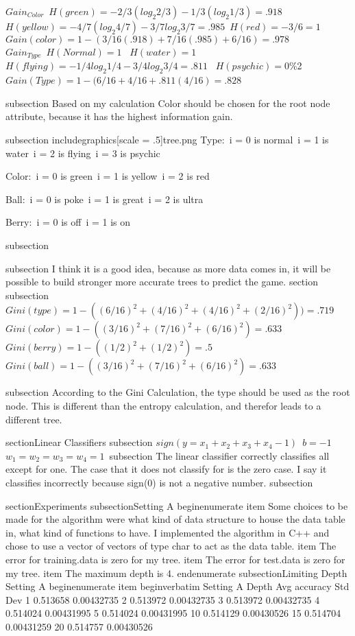 $Gain_{Color}$\
$H(green) = -2/3(log_2{2/3}) - 1/3(log_2{1/3}) = .918$\
$H(yellow) =  -4/7(log_2{4/7}) - 3/7log_2{3/7} = .985$\
$H(red) = -3/6 = 1$\
$Gain(color) = 1 - (3/16(.918) + 7/16(.985) + 6/16) = .978$\\

$Gain_{Type}$\
$H(Normal)= 1$\ %
$H(water) = 1$\ %
$H(flying) = -1/4log_2{1/4} -3/4log_2{3/4} = .811$\ %
$H(psychic) = 0$\%2
$Gain(Type) = 1 - (6/16 + 4/16 + .811(4/16) = .828$\

subsection{}
Based on my calculation Color should be chosen for the root node attribute, because it has the highest information gain.\

subsection{}%
includegraphics[scale = .5]{tree.png}
Type:\
i = 0 is normal\
i = 1 is water\
i = 2 is flying\
i = 3 is psychic\

Color:\
i = 0 is green\
i = 1 is yellow\
i = 2 is red\

Ball:\
i = 0 is poke\
i = 1 is great\
i = 2 is ultra\


Berry:\
i = 0 is off\
i = 1 is on\

subsection{}

subsection{}
I think it is a good idea, because as more data comes in, it will be possible to build stronger more accurate trees to predict the game.
section{}
subsection{}
$Gini(type) = 1 - ((6/16)^2 + (4/16)^2 + (4/16)^2 + (2/16)^2)) = .719$\
$Gini(color) = 1 - ((3/16)^2 + (7/16)^2 + (6/16)^2) = .633$\
$Gini(berry) = 1 - ((1/2)^2 + (1/2)^2) = .5$\
$Gini(ball) = 1 - ((3/16)^2 + (7/16)^2 + (6/16)^2) = .633$\


subsection{}
According to the Gini Calculation, the type should be used as the root node. This is different than the entropy calculation, and therefor leads to a different tree.

section{Linear Classifiers}
subsection{}
$sign(y = x_1 + x_2 + x_3 + x_4 - 1)$\
$b = -1$\
$w_1  = w_2 = w_3 = w_4 = 1$\
subsection{}
The linear classifier correctly classifies all except for one. The case that it does not classify for is the zero case. I say it classifies incorrectly because sign(0) is not a negative number.
subsection{}

section{Experiments}
subsection{Setting A}
begin{enumerate}
item
Some choices to be made for the algorithm were what kind of data structure to house the data table in, what kind of functions to have. I implemented the algorithm in C++ and chose to use a vector of vectors of type char to act as the data table.
item
The error for training.data is zero for my tree.
item
The error for test.data is zero for my tree.
item
The maximum depth is 4.
end{enumerate}
subsection{Limiting Depth Setting A}
begin{enumerate}
item
begin{verbatim}
Setting A
Depth Avg accuracy	Std Dev	
1		0.513658		0.00432735
2		0.513972		0.00432735
3		0.513972		0.00432735
4		0.514024		0.00431995
5		0.514024		0.00431995
10		0.514129		0.00430526
15		0.514704		0.00431259
20		0.514757		0.00430526

